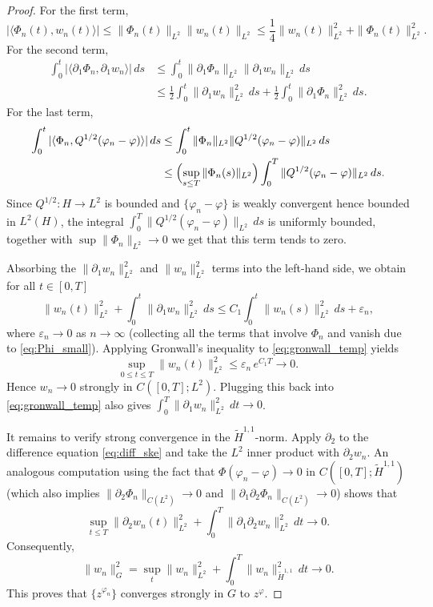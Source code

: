\documentclass[11pt,a4paper,reqno]{amsart}
\theoremstyle{definition}
\begin{document}
\begin{proof}
 For the first term,
      \[
        |\langle \Phi_n(t), w_n(t)\rangle|
        \le \|\Phi_n(t)\|_{L^2} \|w_n(t)\|_{L^2}
        \le \frac14 \|w_n(t)\|_{L^2}^2 + \|\Phi_n(t)\|_{L^2}^2 .
      \]
 For the second term,
      \begin{align*}
        \int_0^t |\langle \partial_1 \Phi_n, \partial_1 w_n\rangle|\,ds
        &\le \int_0^t \|\partial_1 \Phi_n\|_{L^2} \|\partial_1 w_n\|_{L^2}\,ds\\
        &\le \frac12 \int_0^t \|\partial_1 w_n\|_{L^2}^2\,ds
          + \frac12 \int_0^t \|\partial_1 \Phi_n\|_{L^2}^2\,ds .
      \end{align*}
 For the last term,
      \begin{align*}
        \int_0^t |\langle \Phi_n, Q^{1/2}(\varphi_n-\varphi)\rangle|\,ds
        &\le \int_0^t \|\Phi_n\|_{L^2} \|Q^{1/2}(\varphi_n-\varphi)\|_{L^2}\,ds\\
        &\le \Bigl(\sup_{s\le T}\|\Phi_n(s)\|_{L^2}\Bigr)
          \int_0^T \|Q^{1/2}(\varphi_n-\varphi)\|_{L^2}\,ds .
     \end{align*}
      Since $Q^{1/2}:H\to L^2$ is bounded and $\{\varphi_n-\varphi\}$ is weakly convergent hence bounded in $L^2(H)$,
      the integral $\int_0^T \|Q^{1/2}(\varphi_n-\varphi)\|_{L^2}\,ds$ is uniformly bounded, together with
      $\sup\|\Phi_n\|_{L^2}\to0$ we get that this term tends to zero.


  Absorbing the $\|\partial_1 w_n\|_{L^2}^2$ and $\|w_n\|_{L^2}^2$ terms into the left-hand side,
   we obtain for all $t\in[0,T]$
  \begin{equation}\label{eq:gronwall_temp}
    \|w_n(t)\|_{L^2}^2 + \int_0^t \|\partial_1 w_n\|_{L^2}^2\,ds
    \le C_1 \int_0^t \|w_n(s)\|_{L^2}^2\,ds + \varepsilon_n,
  \end{equation}
  where $\varepsilon_n\to0$ as $n\to\infty$ (collecting all the terms that involve $\Phi_n$ and vanish
  due to \eqref{eq:Phi_small}).  Applying Gronwall's inequality to \eqref{eq:gronwall_temp} yields
  \[
    \sup_{0\le t\le T}\|w_n(t)\|_{L^2}^2 \le \varepsilon_n \, e^{C_1 T} \longrightarrow 0 .
  \]
  Hence $w_n\to0$ strongly in $C([0,T];L^2)$.  Plugging this back into \eqref{eq:gronwall_temp} also gives
  $\int_0^T \|\partial_1 w_n\|_{L^2}^2\,dt\to0$.

  It remains to verify strong convergence in the $\widetilde H^{1,1}$-norm.  Apply $\partial_2$ to the
  difference equation \eqref{eq:diff_ske} and take the $L^2$ inner product with $\partial_2 w_n$.  An
  analogous computation using the fact that $\Phi(\varphi_n-\varphi)\to0$ in $C([0,T];\widetilde H^{1,1})$
  (which also implies $\|\partial_2 \Phi_n\|_{C(L^2)}\to0$ and $\|\partial_1\partial_2\Phi_n\|_{C(L^2)}\to0$)
  shows that
  \[
    \sup_{t\le T}\|\partial_2 w_n(t)\|_{L^2}^2 + \int_0^T \|\partial_1\partial_2 w_n\|_{L^2}^2\,dt \longrightarrow 0 .
  \]
  Consequently,
  \[
    \|w_n\|_{G}^2 = \sup_{t}\|w_n\|_{L^2}^2 + \int_0^T \|w_n\|_{\widetilde H^{1,1}}^2\,dt \longrightarrow 0 .
  \]
  This proves that $\{z^{\varphi_n}\}$ converges strongly in $G$ to $z^{\varphi}$.



\end{proof}
\end{document}
